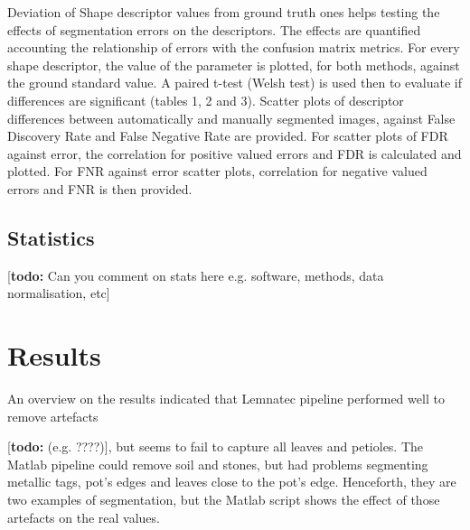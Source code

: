 \documentclass{frontiersSCNS} %
\newcommand{\todo}[1]{
  \rule{0pt}{0pt}\marginpar{{\color{blue}\rule{1ex}{1ex}}}
  {[\textbf{\color{blue}todo:} #1]}}
\begin{document}
Deviation of Shape descriptor values from ground truth ones helps testing the effects of segmentation errors on the descriptors. The effects are quantified accounting the relationship of errors with the confusion matrix metrics. For every shape descriptor, the value of the parameter is plotted, for both methods, against the ground standard value. A paired t-test (Welsh test) is used then to evaluate if differences are significant (tables 1, 2 and 3). Scatter plots of descriptor differences between automatically and manually segmented images, against False Discovery Rate and False Negative Rate are provided. For scatter plots of FDR against error, the correlation for positive valued errors and FDR is calculated and plotted. For FNR against error scatter plots, correlation for negative valued errors and FNR is then provided.





\subsection{Statistics }
\todo{Can you comment on stats here e.g. software, methods, data normalisation, etc}

\section{Results}

An overview on the results indicated that Lemnatec pipeline performed well to remove artefacts \todo{(e.g. ????)}, but seems to fail to capture all leaves and petioles. The Matlab pipeline could remove soil and stones, but had problems segmenting metallic tags, pot's edges and leaves close to the pot's edge. Henceforth, they are two examples of segmentation, but the Matlab script shows the effect of those artefacts on the real values.
\end{document}
